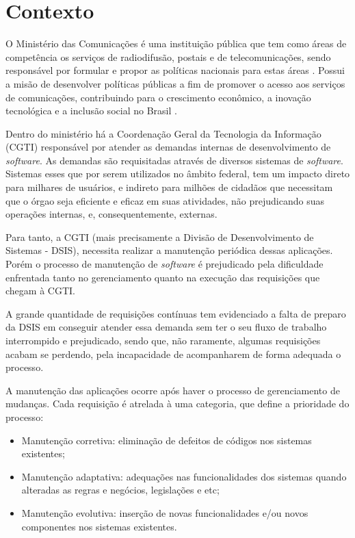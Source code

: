 \chapter[Contexto]{Contexto}

O Ministério das Comunicações é uma instituição pública que tem como áreas de competência os serviços de radiodifusão, postais e de telecomunicações, sendo responsável por formular e propor as políticas nacionais para estas áreas \cite{mcsite001}. Possui a misão de desenvolver políticas públicas a fim de promover o acesso aos serviços de comunicações, contribuindo para o crescimento econômico, a inovação tecnológica e a inclusão social no Brasil \cite{mcsite001}.

Dentro do ministério há a Coordenação Geral da Tecnologia da Informação (CGTI) responsável por atender as demandas internas de desenvolvimento de \emph{software}. As demandas são requisitadas através de diversos sistemas de \emph{software}. Sistemas esses que por serem utilizados no âmbito federal, tem um impacto direto para milhares de usuários, e indireto para milhões de cidadãos que necessitam que o órgao seja eficiente e eficaz em suas atividades, não prejudicando suas operações internas, e, consequentemente, externas.

Para tanto, a CGTI (mais precisamente a Divisão de Desenvolvimento de Sistemas - DSIS), necessita realizar a manutenção periódica dessas aplicações. Porém o processo de manutenção de \emph{software} é prejudicado pela dificuldade enfrentada tanto no gerenciamento quanto na execução das requisições que chegam à CGTI.

A grande quantidade de requisições contínuas tem evidenciado a falta de preparo da DSIS em conseguir atender essa demanda sem ter o seu fluxo de trabalho interrompido e prejudicado, sendo que, não raramente, algumas requisições acabam se perdendo, pela incapacidade de acompanharem de forma adequada o processo.

A manutenção das aplicações ocorre após haver o processo de gerenciamento de mudanças. Cada requisição é atrelada à uma categoria, que define a prioridade do processo:

\begin{itemize}
  \item Manutenção corretiva: eliminação de defeitos de códigos nos sistemas existentes;
  \item Manutenção adaptativa: adequações nas funcionalidades dos sistemas quando alteradas as regras e negócios, legislações e etc;
  \item Manutenção evolutiva: inserção de novas funcionalidades e/ou novos componentes nos sistemas existentes.
\end{itemize}

